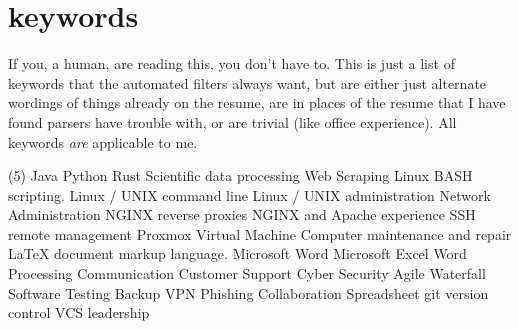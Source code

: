 \documentclass[letterpaper,10pt]{article}
\begin{document}
\section*{keywords}
	{\small
	If you, a human, are reading this, you don't have to. This is just a list of keywords that the automated filters always want, but are either just alternate wordings of things already on the resume, are in places of the resume that I have found parsers have trouble with, or are trivial (like office experience). All keywords \emph{are} applicable to me.
	\tiny
	\begin{tasks}[style=itemize](5)
			\task Java
			\task Python
			\task Rust
			\task Scientific data processing
			\task Web Scraping
			\task Linux BASH scripting.
			\task Linux / UNIX command line
			\task Linux / UNIX administration
			\task Network Administration
			\task NGINX reverse proxies
			\task NGINX and Apache experience
			\task SSH remote management
			\task Proxmox
			\task Virtual Machine
			\task Computer maintenance and repair
			\task LaTeX document markup language.
			\task Microsoft Word
			\task Microsoft Excel
			\task Word Processing
			\task Communication
			\task Customer Support
			\task Cyber Security
			\task Agile
			\task Waterfall
			\task Software Testing
			\task Backup
			\task VPN
			\task Phishing
			\task Collaboration
			\task Spreadsheet
			\task git
			\task version control
			\task VCS
			\task leadership
	\end{tasks}
	}
\end{document}
